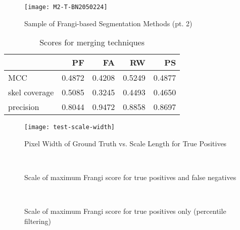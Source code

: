 \begin{figure}[p] \centering
 \texttt{[image: M2-T-BN2050224]}
 \caption{Sample of Frangi-based Segmentation Methods (pt. 2)}
  \end{figure}

\begin{table}[p]\centering
  \begin{tabular}{l|rrrr}
    {} &        PF &        FA &        RW &        PS \\
    \hline
    MCC           &  0.4872 &  0.4208 &  0.5249 &  0.4877 \\
    skel coverage &  0.5085 &  0.3245 &  0.4493 &  0.4650 \\
    precision     &  0.8044 &  0.9472 &  0.8858 &  0.8697 \\
  \end{tabular}
\caption{Scores for merging techniques}
\end{table}

\begin{figure}[p]
  \texttt{[image: test-scale-width]}
  \caption{Pixel Width of Ground Truth vs. Scale Length for True Positives}
\end{figure}

\begin{figure}[p]\centering
  \\[-0.5cm]
  \caption{Scale of maximum Frangi score for true positives and false negatives}
\end{figure}

\begin{figure}[p]\centering
  \\[-0.5cm]
  \caption{Scale of maximum Frangi score for true positives only (percentile filtering)}
\end{figure}
